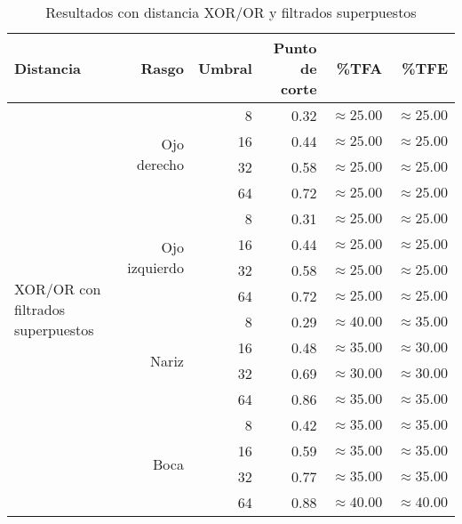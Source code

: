 \begin{table}
\begin{tabular}{|l|r|r|r|r|r|}
 \hline
  Distancia & Rasgo & Umbral & Punto de corte & \%TFA  & \%TFE \\
  \hline \hline
  \multirow{16}{*}{XOR/OR con filtrados superpuestos}
& \multirow{4}{*}{Ojo derecho} & 8  & 0.32 & $\approx 25.00$ & $\approx 25.00$ \\
& & 16 & 0.44 & $\approx 25.00$ & $\approx 25.00$ \\
& & 32 & 0.58 & $\approx 25.00$ & $\approx 25.00$ \\
& & 64 & 0.72 & $\approx 25.00$ & $\approx 25.00$ \\ \cline{2-6}

& \multirow{4}{*}{Ojo izquierdo} & 8  & 0.31 & $\approx 25.00$ & $\approx 25.00$ \\
& & 16 & 0.44 & $\approx 25.00$ & $\approx 25.00$ \\
& & 32 & 0.58 & $\approx 25.00$ & $\approx 25.00$ \\
& & 64 & 0.72 & $\approx 25.00$ & $\approx 25.00$ \\ \cline{2-6}

& \multirow{4}{*}{Nariz} & 8  & 0.29 & $\approx 40.00$ & $\approx 35.00$ \\
& & 16 & 0.48 & $\approx 35.00$ & $\approx 30.00$ \\
& & 32 & 0.69 & $\approx 30.00$ & $\approx 30.00$ \\
& & 64 & 0.86 & $\approx 35.00$ & $\approx 35.00$ \\ \cline{2-6}

& \multirow{4}{*}{Boca} & 8  & 0.42 & $\approx 35.00$ & $\approx 35.00$ \\
& & 16 & 0.59 & $\approx 35.00$ & $\approx 35.00$ \\
& & 32 & 0.77 & $\approx 35.00$ & $\approx 35.00$ \\
& & 64 & 0.88 & $\approx 40.00$ & $\approx 40.00$ \\ \hline

 \end{tabular}
 \caption{Resultados con distancia XOR/OR y filtrados superpuestos}
 \label{tab:xor_super}
\end{table}
